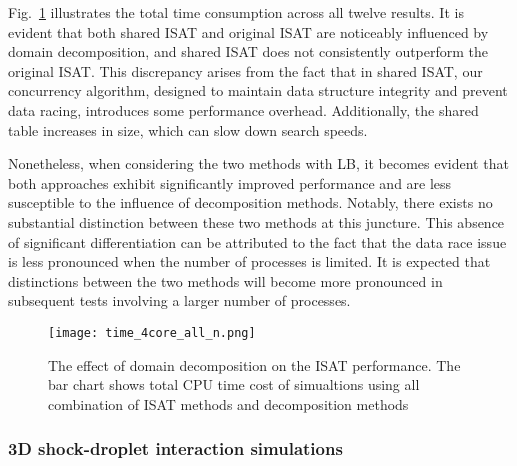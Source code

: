 Fig.~\ref{MPI_4core_all} illustrates the total time consumption across all twelve results. It is evident that both shared ISAT and original ISAT are noticeably influenced by domain decomposition, and shared ISAT does not consistently outperform the original ISAT. This discrepancy arises from the fact that in shared ISAT, our concurrency algorithm, designed to maintain data structure integrity and prevent data racing, introduces some performance overhead. Additionally, the shared table increases in size, which can slow down search speeds.


Nonetheless, when considering the two methods with LB, it becomes evident that both approaches exhibit significantly improved performance and are less susceptible to the influence of decomposition methods.  Notably, there exists no substantial distinction between these two methods at this juncture. This absence of significant differentiation can be attributed to the fact that the data race issue is less pronounced when the number of processes is limited. It is expected that distinctions between the two methods will become more pronounced in subsequent tests involving a larger number of processes.


\begin{figure}[htbp]
	\centering
	\texttt{[image: time\_4core\_all\_n.png]}

	\caption{The effect of domain decomposition on the ISAT performance. The bar chart shows total CPU time cost of simualtions using all combination of ISAT methods and decomposition methods}\label{MPI_4core_all}
\end{figure}

\subsubsection{3D shock-droplet interaction simulations}



